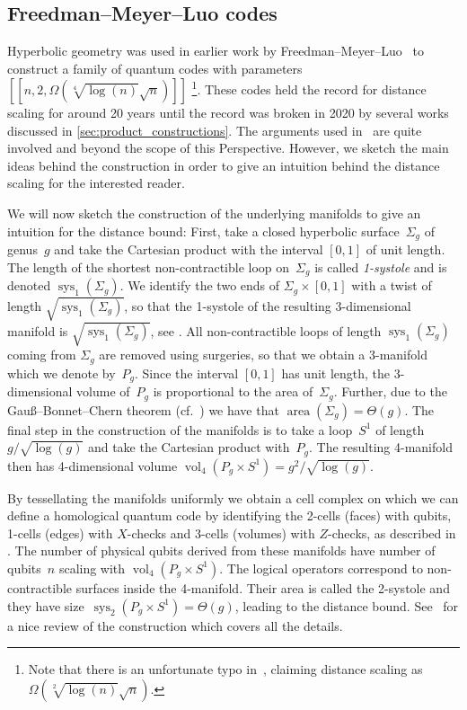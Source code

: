 \documentclass[amsmath, amssymb, floatfix, reprint, twocolumn, notitlepage, 10pt]{revtex4-1}
\newcommand{\change}{}
\newcommand{\changetwo}{}
\newcommand{\sys}{\operatorname{sys}}
\newcommand{\vol}{\operatorname{vol}}
\newcommand{\area}{\operatorname{area}}
\begin{document}
\subsection{Freedman--Meyer--Luo codes}\label{sec:freedman_meyer_luo}
Hyperbolic geometry was used in earlier work by Freedman--Meyer--Luo~\cite{freedman2002z2} to construct a family of quantum codes with parameters $[[n,2,\Omega(\sqrt[4]{\log(n)}\sqrt{n})]]$ \footnote{{\change Note that there is an unfortunate typo in~\cite{freedman2002z2}, claiming distance scaling as $\Omega(\sqrt[2]{\log(n)}\sqrt{n})$.}}.
These codes held the record for distance scaling for around 20 years until the record was broken in 2020 by several works discussed in \cref{sec:product_constructions}.
{\change
The arguments used in~\cite{freedman2002z2} are quite involved and beyond the scope of this Perspective. However, we sketch the main ideas behind the construction in order to give an intuition behind the distance scaling for the interested reader.
}

{\changetwo
We will now sketch the construction of the underlying manifolds to give an intuition for the distance bound:
First, take a closed hyperbolic surface~$\Sigma_g$ of genus~$g$ and take the Cartesian product with the interval $[0,1]$ of unit length.
The length of the shortest non-contractible loop on~$\Sigma_g$ is called \emph{1-systole} and is denoted $\sys_1(\Sigma_g)$.
We identify the two ends of $\Sigma_g\times [0,1]$ with a twist of length $\sqrt{\sys_1(\Sigma_g)}$, so that the 1-systole of the resulting 3-dimensional manifold is $\sqrt{\sys_1(\Sigma_g)}$, see .
All non-contractible loops of length $\sys_1(\Sigma_g)$ coming from $\Sigma_g$ are removed using surgeries, so that we obtain a 3-manifold which we denote by~$P_g$.
Since the interval $[0,1]$ has unit length, the 3-dimensional volume of~$P_g$ is proportional to the area of~$\Sigma_g$.
Further, due to the Gau\ss --Bonnet--Chern theorem (cf.~) we have that $\area(\Sigma_g) = \Theta(g)$.
The final step in the construction of the manifolds is to take a loop~$S^1$ of length~$g/\sqrt{\log(g)}$ and take the Cartesian product with~$P_g$.
The resulting 4-manifold then has 4-dimensional volume $\vol_4(P_g \times S^1)=g^2/\sqrt{\log(g)}$.

By tessellating the manifolds uniformly we obtain a cell complex on which we can define a homological quantum code by identifying the 2-cells (faces) with qubits, 1-cells (edges) with $X$-checks and 3-cells (volumes) with $Z$-checks, as described in .
The number of physical qubits derived from these manifolds have number of qubits~$n$ scaling with $\vol_4(P_g \times S^1)$.
The logical operators correspond to non-contractible surfaces inside the 4-manifold.
Their area is called the 2-systole and they have size~$\sys_2(P_g \times S^1)=\Theta(g)$, leading to the distance bound.
See~\cite{fetaya2011homological} for a nice review of the construction which covers all the details.}
\end{document}
